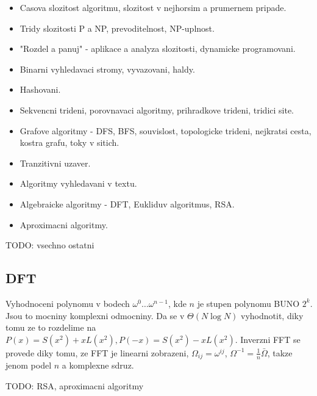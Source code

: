\begin{itemize}
\item Casova slozitost algoritmu, slozitost v nejhorsim a prumernem pripade.
\item Tridy slozitosti P a NP, prevoditelnost, NP-uplnost.
\item "Rozdel a panuj" - aplikace a analyza slozitosti, dynamicke programovani.
\item Binarni vyhledavaci stromy, vyvazovani, haldy.
\item Hashovani.
\item Sekvencni trideni, porovnavaci algoritmy, prihradkove trideni, tridici site.
\item Grafove algoritmy - DFS, BFS, souvislost, topologicke trideni, nejkratsi cesta, kostra grafu, toky v sitich.
\item Tranzitivni uzaver.
\item Algoritmy vyhledavani v textu.
\item Algebraicke algoritmy - DFT, Eukliduv algoritmus, RSA.
\item Aproximacni algoritmy.
\end{itemize}

TODO: vsechno ostatni

\subsection{DFT}

Vyhodnoceni polynomu v bodech $\omega^0\ldots\omega^{n-1}$, kde
$n$ je stupen polynomu BUNO $2^k$. Jsou to mocniny komplexni odmocniny.
Da se v $\Theta(N\log N)$ vyhodnotit, diky tomu ze to rozdelime na
$P(x)=S(x^2)+xL(x^2), P(-x)=S(x^2)-xL(x^2)$. Inverzni FFT se provede
diky tomu, ze FFT je linearni zobrazeni, $\Omega_{ij}=\omega^{ij}$,
$\Omega^{-1}=\frac{1}{n}\bar{\Omega}$, takze jenom podel $n$ a komplexne sdruz.

TODO: RSA, aproximacni algoritmy
